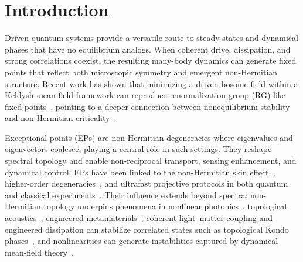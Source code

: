 \documentclass[%
  aps,prb,reprint,amsmath,amssymb,superscriptaddress,longbibliography,floatfix
]{revtex4-2}
\begin{document}
\section{Introduction}
\label{sec:intro}

Driven quantum systems provide a versatile route to steady states
and dynamical phases that have no equilibrium analogs.
When coherent drive, dissipation, and strong correlations coexist,
the resulting many-body dynamics can generate fixed points that
reflect both microscopic symmetry and emergent non-Hermitian
structure.
Recent work has shown that minimizing a driven bosonic field within
a Keldysh mean-field framework can reproduce renormalization-group
(RG)-like fixed points~\cite{kamenev2023field,popruzhenko2014keldysh,maghrebi2016nonequilibrium},
pointing to a deeper connection between nonequilibrium stability
and non-Hermitian criticality~\cite{kulkscipo,Claeys2022RGdissipative}.

Exceptional points (EPs) are non-Hermitian degeneracies where
eigenvalues and eigenvectors coalesce, playing a central role in
such settings.
They reshape spectral topology and enable non-reciprocal transport,
sensing enhancement, and dynamical control.
EPs have been linked to the non-Hermitian skin
effect~\cite{YaoWang2018}, higher-order
degeneracies~\cite{higherorder,PhysRevLett.126.110404},
and ultrafast projective protocols in both quantum and classical
experiments~\cite{wan2023evidence,mentink2015ultrafast}.
Their influence extends beyond spectra: non-Hermitian topology
underpins phenomena in nonlinear
photonics~\cite{xia2021nonlinear,smirnova2020nonlinear},
topological acoustics~\cite{xue2022topological},
engineered metamaterials~\cite{RevModPhys.96.015002};
coherent light--matter
coupling and engineered dissipation can stabilize correlated states
such as topological Kondo phases~\cite{hu2025ceco2p2}, and
nonlinearities can generate instabilities captured by dynamical
mean-field theory~\cite{aoki2014nonequilibrium,PhysRevX.7.031013}.
\end{document}
